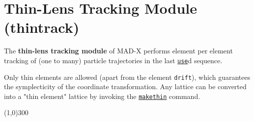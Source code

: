







   

\section{Thin-Lens Tracking Module (thintrack)}


 The \textbf{thin-lens tracking module} of MAD-X performs element per element tracking of (one to many) 
 particle trajectories in the last \href{../control/general.html#use}{\texttt{use}}d sequence. 
 

 Only thin elements are allowed (apart from the element \texttt{drift}), which guarantees
 the symplecticity of the coordinate transformation. Any lattice can be converted into a "thin element" lattice
 by invoking the \href{../makethin/makethin.html}{\texttt{makethin}} command.
 

\line(1,0){300}

